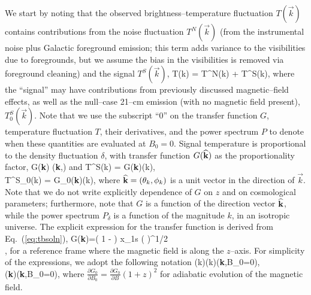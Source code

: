 We start by noting that the observed brightness--temperature fluctuation $T(\vec k)$ contains contributions from the noise fluctuation $T^N(\vec k)$ (from the instrumental noise plus Galactic foreground emission; this term adds variance to the visibilities due to foregrounds, but we assume the bias in the visibilities is removed via foreground cleaning) and the signal $T^S(\vec k)$, 
\beq
\bga
T(\vec k) = T^N(\vec k) + T^S(\vec k),
\ega
\label{eq:Ttot}
\eeq
where the ``signal'' may have contributions from previously discussed magnetic--field effects, as well as the null--case 21--cm emission (with no magnetic field present), $T^S_0(\vec k)$. Note that we use the subscript ``0'' on the transfer function $G$, temperature fluctuation $T$, their derivatives, and the power spectrum $P$ to denote when these quantities are evaluated at $B_0=0$. Signal temperature is proportional to the density fluctuation $\delta$, with transfer function $G({\bf{\widehat k}})$ as the proportionality factor, 
\beq
\bga
G({\bf{\widehat k}}) \equiv {}({\bf{\widehat k}},)
\ega
\eeq
and
\beq
\bga
T^S(\vec k) = G({\bf{\widehat k}})\delta(k),\\
T^S_0(\vec k) = G_0({\bf{\widehat k}})\delta(k),
\ega
\label{eq:def_G}
\eeq
where ${\bf{\widehat k}}=(\theta_k,\phi_k)$ is a unit vector in the direction of $\vec k$. Note that we do not write explicitly dependence of $G$ on $z$ and on cosmological parameters; furthermore, note that $G$ is a function of the direction vector ${\bf{\widehat k}}$, while the power spectrum $P_\delta$ is a function of the magnitude $k$, in an isotropic universe. 
The explicit expression for the transfer function is derived from Eq.~(\ref{eq:tbsoln}),
\beq
\bga
G({\bf{\widehat k}})=\left( 1 -  \right) x_{1{\rm s}} \left(  \right)^{1/2} \\
\times {} ,
\label{eq:G_def}
\ega
\eeq
for a reference frame where the magnetic field is along the $z$--axis.
For simplicity of the expressions, we adopt the following notation
\beq
\bga
{}(\vec k)\equiv  \delta(k)({\bf{\widehat k}},B_0=0),\\
({\bf{\widehat k}})\equiv{}({\bf{\widehat k}},B_0=0),
\ega
\label{eq:dTdB_dGdB}
\eeq
where $\frac{\partial G_0}{\partial B_0}=\frac{\partial G_0}{\partial B} (1+z)^2$ for adiabatic evolution of the magnetic field. 

